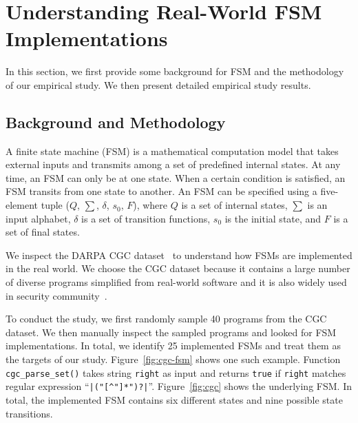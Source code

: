 \section{Understanding Real-World FSM Implementations}
\label{sec:study}


In this section, we first provide some background 
for FSM and the methodology of our empirical study. 
We then present detailed empirical study results. 



\subsection{Background and Methodology}






A finite state machine (FSM) is a mathematical computation model
that takes external inputs and transmits among a set of predefined internal states. 
At any time, an FSM can only be at one state.
When a certain condition is satisfied,
an FSM transits from one state to another.
An FSM can be specified using a five-element tuple ($Q$, $\sum$, $\delta$, $s_0$, $F$),
where $Q$ is a set of internal states, $\sum$ is an input alphabet,
$\delta$ is a set of transition functions,
$s_0$ is the initial state, and $F$ is 
a set of final states.

We inspect the DARPA CGC dataset~\cite{CGC} to
understand how FSMs are implemented in the real world.
We choose the CGC dataset because it
contains a large number of diverse programs simplified
from real-world software and it
is also widely used in security
community~\cite{QSYM, Driller, VUzzer}.






To conduct the study, we first randomly sample
40 programs from the CGC dataset.
We then manually inspect the sampled programs and looked for 
FSM implementations.
In total, we identify 25 implemented FSMs
and treat them as the targets of our study.
Figure~\ref{fig:cgc-fsm} shows one such example.
Function \texttt{cgc\_parse\_set()} takes string \texttt{right}
as input and returns \texttt{true} if \texttt{right} matches
regular expression ``\verb/|("[^"]*")?|/''.
Figure~\ref{fig:cgc} shows the underlying FSM.
In total, the implemented FSM contains six different states
and nine possible state transitions.



